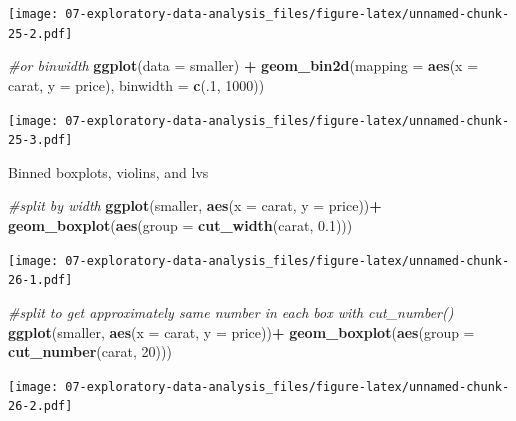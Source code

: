 \documentclass[]{book}
\newenvironment{Shaded}{\begin{snugshade}}{\end{snugshade}}
\newcommand{\CommentTok}[1]{\textcolor[rgb]{0.56,0.35,0.01}{\textit{#1}}}
\newcommand{\DataTypeTok}[1]{\textcolor[rgb]{0.13,0.29,0.53}{#1}}
\newcommand{\DecValTok}[1]{\textcolor[rgb]{0.00,0.00,0.81}{#1}}
\newcommand{\FloatTok}[1]{\textcolor[rgb]{0.00,0.00,0.81}{#1}}
\newcommand{\KeywordTok}[1]{\textcolor[rgb]{0.13,0.29,0.53}{\textbf{#1}}}
\newcommand{\NormalTok}[1]{#1}
\newcommand{\OperatorTok}[1]{\textcolor[rgb]{0.81,0.36,0.00}{\textbf{#1}}}
\newcommand{\StringTok}[1]{\textcolor[rgb]{0.31,0.60,0.02}{#1}}
\theoremstyle{definition}
\theoremstyle{definition}
\theoremstyle{definition}
\theoremstyle{remark}
\begin{document}
\texttt{[image: 07-exploratory-data-analysis\_files/figure-latex/unnamed-chunk-25-2.pdf]}

\begin{Shaded}
\begin{Highlighting}[]
\CommentTok{#or binwidth}
\KeywordTok{ggplot}\NormalTok{(}\DataTypeTok{data =}\NormalTok{ smaller) }\OperatorTok{+}
\StringTok{  }\KeywordTok{geom_bin2d}\NormalTok{(}\DataTypeTok{mapping =} \KeywordTok{aes}\NormalTok{(}\DataTypeTok{x =}\NormalTok{ carat, }\DataTypeTok{y =}\NormalTok{ price), }\DataTypeTok{binwidth =} \KeywordTok{c}\NormalTok{(.}\DecValTok{1}\NormalTok{, }\DecValTok{1000}\NormalTok{))}
\end{Highlighting}
\end{Shaded}

\texttt{[image: 07-exploratory-data-analysis\_files/figure-latex/unnamed-chunk-25-3.pdf]}

Binned boxplots, violins, and lvs

\begin{Shaded}
\begin{Highlighting}[]
\CommentTok{#split by width}
\KeywordTok{ggplot}\NormalTok{(smaller, }\KeywordTok{aes}\NormalTok{(}\DataTypeTok{x =}\NormalTok{ carat, }\DataTypeTok{y =}\NormalTok{ price))}\OperatorTok{+}
\StringTok{  }\KeywordTok{geom_boxplot}\NormalTok{(}\KeywordTok{aes}\NormalTok{(}\DataTypeTok{group =} \KeywordTok{cut_width}\NormalTok{(carat, }\FloatTok{0.1}\NormalTok{)))}
\end{Highlighting}
\end{Shaded}

\texttt{[image: 07-exploratory-data-analysis\_files/figure-latex/unnamed-chunk-26-1.pdf]}

\begin{Shaded}
\begin{Highlighting}[]
\CommentTok{#split to get approximately same number in each box with cut_number()}
\KeywordTok{ggplot}\NormalTok{(smaller, }\KeywordTok{aes}\NormalTok{(}\DataTypeTok{x =}\NormalTok{ carat, }\DataTypeTok{y =}\NormalTok{ price))}\OperatorTok{+}
\StringTok{  }\KeywordTok{geom_boxplot}\NormalTok{(}\KeywordTok{aes}\NormalTok{(}\DataTypeTok{group =} \KeywordTok{cut_number}\NormalTok{(carat, }\DecValTok{20}\NormalTok{)))}
\end{Highlighting}
\end{Shaded}

\texttt{[image: 07-exploratory-data-analysis\_files/figure-latex/unnamed-chunk-26-2.pdf]}
\end{document}
